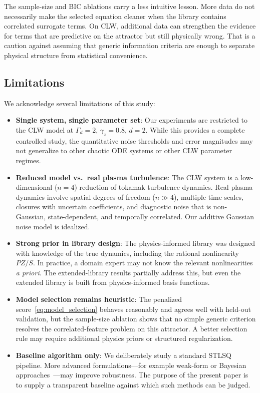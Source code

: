 \documentclass[12pt]{article}
\begin{document}
The sample-size and BIC ablations carry a less intuitive lesson.
More data do not necessarily make the selected equation cleaner when the library contains correlated surrogate terms.
On CLW, additional data can strengthen the evidence for terms that are predictive on the attractor but still physically wrong.
That is a caution against assuming that generic information criteria are enough to separate physical structure from statistical convenience.

\subsection{Limitations}

We acknowledge several limitations of this study:

\begin{itemize}
\item \textbf{Single system, single parameter set}: Our experiments are restricted to the CLW model at $\Gamma_d=2$, $\gamma_z=0.8$, $d=2$. While this provides a complete controlled study, the quantitative noise thresholds and error magnitudes may not generalize to other chaotic ODE systems or other CLW parameter regimes.

\item \textbf{Reduced model vs.\ real plasma turbulence}: The CLW system is a low-dimensional ($n=4$) reduction of tokamak turbulence dynamics. Real plasma dynamics involve spatial degrees of freedom ($n\gg 4$), multiple time scales, closures with uncertain coefficients, and diagnostic noise that is non-Gaussian, state-dependent, and temporally correlated. Our additive Gaussian noise model is idealized.

\item \textbf{Strong prior in library design}: The physics-informed library was designed with knowledge of the true dynamics, including the rational nonlinearity $PZ/S$. In practice, a domain expert may not know the relevant nonlinearities \emph{a priori}. The extended-library results partially address this, but even the extended library is built from physics-informed basis functions.

\item \textbf{Model selection remains heuristic}: The penalized score~\eqref{eq:model_selection} behaves reasonably and agrees well with held-out validation, but the sample-size ablation shows that no simple generic criterion resolves the correlated-feature problem on this attractor. A better selection rule may require additional physics priors or structured regularization.

\item \textbf{Baseline algorithm only}: We deliberately study a standard STLSQ pipeline. More advanced formulations---for example weak-form or Bayesian approaches~\cite{Messenger2021}---may improve robustness. The purpose of the present paper is to supply a transparent baseline against which such methods can be judged.
\end{itemize}
\end{document}
